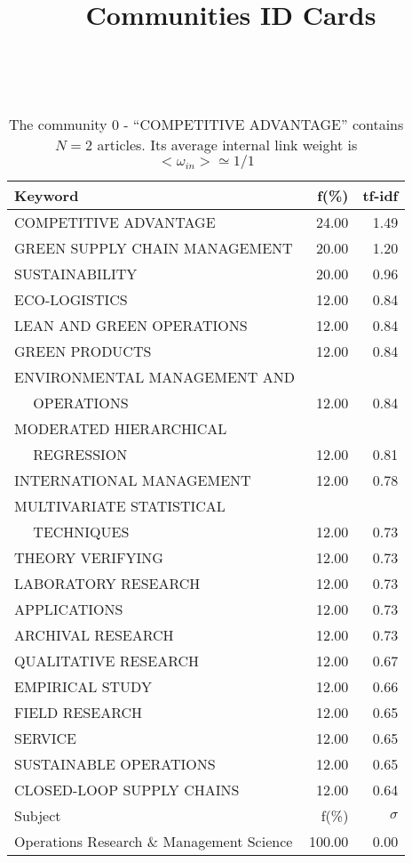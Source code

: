 \documentclass[a4paper,11pt]{report}
\title{{\bf Communities ID Cards}}
\date{\begin{flushleft}This document gather the ``ID Cards'' of the CC communities found within your database.\\
 The CC network was built by keeping a link between articles sharing at least 5 references. The communities characterized here correspond to the ones found in the level 0 (in the sense of the Louvain algo) which gathers more than 0 articles.\\
 These ID cards displays the most frequent keywords, subject categories, journals of publication, institution, countries, authors, references and reference journals of the articles of each community. The significance of an item $\sigma = \sqrt{N} (f - p) / \sqrt{p(1-p)}$ [where $N$ is the number of articles within the community and $f$ and $p$ are the proportion of articles respectively within the community and within the database displaying that item ] is also given (for example $\sigma > 5$ is really highly significant). The tf-idf value which can be calculated by $tf-idf = f*log(frac{1}{p})$ is also given.\\
\vspace{1cm}
\copyright Sebastian Grauwin, Liu Weizhi - (2014) \end{flushleft}}
\begin{document}
\begin{landscape}
\maketitle
\clearpage

\begin{table}[!ht]
\caption{The community 0 - ``COMPETITIVE ADVANTAGE'' contains $N = 2$ articles. Its average internal link weight is $<\omega_{in}> \simeq 1/1$ }
\textcolor{white}{aa}\\
{\scriptsize\begin{tabular}{|l r  r|}
\hline
Keyword & f(\%) & tf-idf \\
\hline
COMPETITIVE ADVANTAGE & 24.00 & 1.49\\
GREEN SUPPLY CHAIN MANAGEMENT & 20.00 & 1.20\\
SUSTAINABILITY & 20.00 & 0.96\\
ECO-LOGISTICS & 12.00 & 0.84\\
LEAN AND GREEN OPERATIONS & 12.00 & 0.84\\
GREEN PRODUCTS & 12.00 & 0.84\\
ENVIRONMENTAL MANAGEMENT AND &  &\\
$\quad$ OPERATIONS & 12.00 & 0.84\\
MODERATED HIERARCHICAL &  &\\
$\quad$ REGRESSION & 12.00 & 0.81\\
INTERNATIONAL MANAGEMENT & 12.00 & 0.78\\
MULTIVARIATE STATISTICAL &  &\\
$\quad$ TECHNIQUES & 12.00 & 0.73\\
THEORY VERIFYING & 12.00 & 0.73\\
LABORATORY RESEARCH & 12.00 & 0.73\\
APPLICATIONS & 12.00 & 0.73\\
ARCHIVAL RESEARCH & 12.00 & 0.73\\
QUALITATIVE RESEARCH & 12.00 & 0.67\\
EMPIRICAL STUDY & 12.00 & 0.66\\
FIELD RESEARCH & 12.00 & 0.65\\
SERVICE & 12.00 & 0.65\\
SUSTAINABLE OPERATIONS & 12.00 & 0.65\\
CLOSED-LOOP SUPPLY CHAINS & 12.00 & 0.64\\
\hline
\hline
Subject & f(\%) & $\sigma$\\
\hline
Operations Research \& Management Science & 100.00 & 0.00\\

\end{tabular}}
\end{table}
\end{landscape}
\end{document}
